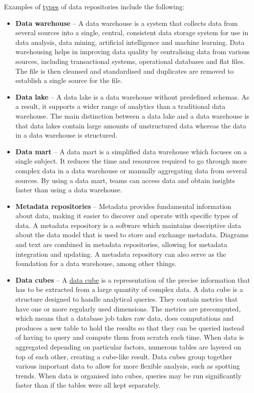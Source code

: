 \documentclass[
]{book}
\begin{document}
Examples of \href{https://stealthbits.com/blog/what-is-a-data-repository-and-what-is-it-used-for/}{types} of data repositories include the following:

\begin{itemize}
\item
  \textbf{Data warehouse} -- A data warehouse is a system that collects data from several sources into a single, central, consistent data storage system for use in data analysis, data mining, artificial intelligence and machine learning. Data warehousing helps in improving data quality by centralising data from various sources, including transactional systems, operational databases and flat files. The file is then cleansed and standardised and duplicates are removed to establish a single source for the file.
\item
  \textbf{Data lake} -- A data lake is a data warehouse without predefined schemas. As a result, it supports a wider range of analytics than a traditional data warehouse. The main distinction between a data lake and a data warehouse is that data lakes contain large amounts of unstructured data whereas the data in a data warehouse is structured.
\item
  \textbf{Data mart} -- A data mart is a simplified data warehouse which focuses on a single subject. It reduces the time and resources required to go through more complex data in a data warehouse or manually aggregating data from several sources. By using a data mart, teams can access data and obtain insights faster than using a data warehouse.
\item
  \textbf{Metadata repositories} -- Metadata provides fundamental information about data, making it easier to discover and operate with specific types of data. A metadata repository is a software which maintains descriptive data about the data model that is used to store and exchange metadata. Diagrams and text are combined in metadata repositories, allowing for metadata integration and updating. A metadata repository can also serve as the foundation for a data warehouse, among other things.
\item
  \textbf{Data cubes} -- A \href{https://www.metabase.com/learn/databases/data-cube}{data cube} is a representation of the precise information that has to be extracted from a large quantity of complex data. A data cube is a structure designed to handle analytical queries. They contain metrics that have one or more regularly used dimensions. The metrics are precomputed, which means that a database job takes raw data, does computations and produces a new table to hold the results so that they can be queried instead of having to query and compute them from scratch each time. When data is aggregated depending on particular factors, numerous tables are layered on top of each other, creating a cube-like result. Data cubes group together various important data to allow for more flexible analysis, such as spotting trends. When data is organised into cubes, queries may be run significantly faster than if the tables were all kept separately.

\end{itemize}
\end{document}
